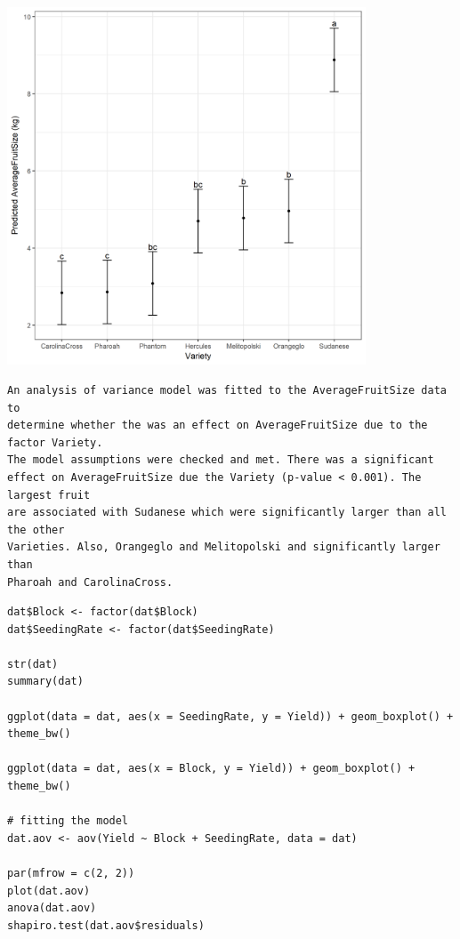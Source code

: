 \documentclass[a4paper, 10pt, fleqn, twosided]{memoir}
\begin{document}
\begin{tcolorbox}[title = Exercise 3 output continued]
\includegraphics[width=0.8\textwidth, frame]{Exercise3Pred.png}

\end{tcolorbox}

\begin{tcolorbox}[title = Exercise 3 interpretation]
\begin{verbatim}
An analysis of variance model was fitted to the AverageFruitSize data to
determine whether the was an effect on AverageFruitSize due to the factor Variety.
The model assumptions were checked and met. There was a significant
effect on AverageFruitSize due the Variety (p-value < 0.001). The largest fruit
are associated with Sudanese which were significantly larger than all the other
Varieties. Also, Orangeglo and Melitopolski and significantly larger than
Pharoah and CarolinaCross.
\end{verbatim}
\end{tcolorbox}

\clearpage




\begin{tcolorbox}[title = Exercise 4 code]
\begin{verbatim}
dat$Block <- factor(dat$Block)
dat$SeedingRate <- factor(dat$SeedingRate)

str(dat)
summary(dat)

ggplot(data = dat, aes(x = SeedingRate, y = Yield)) + geom_boxplot() +
theme_bw()

ggplot(data = dat, aes(x = Block, y = Yield)) + geom_boxplot() +
theme_bw()

# fitting the model
dat.aov <- aov(Yield ~ Block + SeedingRate, data = dat)

par(mfrow = c(2, 2))
plot(dat.aov)
anova(dat.aov)
shapiro.test(dat.aov$residuals)
\end{verbatim}
\end{tcolorbox}
\end{document}
